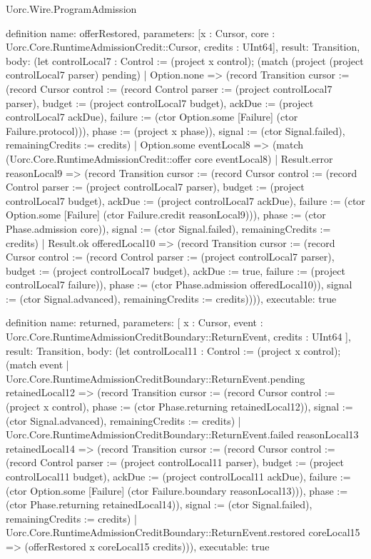 \begin{lexlean}{Uorc.Wire.ProgramAdmission}
\begin{semanticmodule}
definition{
  name: offerRestored,
  parameters: [x : Cursor, core : Uorc.Core.RuntimeAdmissionCredit::Cursor, credits : UInt64],
  result: Transition,
  body: (let controlLocal7 : Control := (project x control); (match (project (project controlLocal7 parser) pending)
    | Option.none => (record Transition {cursor := (record Cursor {control := (record Control {parser := (project controlLocal7 parser), budget := (project controlLocal7 budget), ackDue := (project controlLocal7 ackDue), failure := (ctor Option.some [Failure] (ctor Failure.protocol))}), phase := (project x phase)}), signal := (ctor Signal.failed), remainingCredits := credits})
    | Option.some eventLocal8 => (match (Uorc.Core.RuntimeAdmissionCredit::offer core eventLocal8)
      | Result.error reasonLocal9 => (record Transition {cursor := (record Cursor {control := (record Control {parser := (project controlLocal7 parser), budget := (project controlLocal7 budget), ackDue := (project controlLocal7 ackDue), failure := (ctor Option.some [Failure] (ctor Failure.credit reasonLocal9))}), phase := (ctor Phase.admission core)}), signal := (ctor Signal.failed), remainingCredits := credits})
      | Result.ok offeredLocal10 => (record Transition {cursor := (record Cursor {control := (record Control {parser := (project controlLocal7 parser), budget := (project controlLocal7 budget), ackDue := true, failure := (project controlLocal7 failure)}), phase := (ctor Phase.admission offeredLocal10)}), signal := (ctor Signal.advanced), remainingCredits := credits})))),
  executable: true
}

definition{
  name: returned,
  parameters: [
    x : Cursor,
    event : Uorc.Core.RuntimeAdmissionCreditBoundary::ReturnEvent,
    credits : UInt64
  ],
  result: Transition,
  body: (let controlLocal11 : Control := (project x control); (match event
    | Uorc.Core.RuntimeAdmissionCreditBoundary::ReturnEvent.pending retainedLocal12 => (record Transition {cursor := (record Cursor {control := (project x control), phase := (ctor Phase.returning retainedLocal12)}), signal := (ctor Signal.advanced), remainingCredits := credits})
    | Uorc.Core.RuntimeAdmissionCreditBoundary::ReturnEvent.failed reasonLocal13 retainedLocal14 => (record Transition {cursor := (record Cursor {control := (record Control {parser := (project controlLocal11 parser), budget := (project controlLocal11 budget), ackDue := (project controlLocal11 ackDue), failure := (ctor Option.some [Failure] (ctor Failure.boundary reasonLocal13))}), phase := (ctor Phase.returning retainedLocal14)}), signal := (ctor Signal.failed), remainingCredits := credits})
    | Uorc.Core.RuntimeAdmissionCreditBoundary::ReturnEvent.restored coreLocal15 => (offerRestored x coreLocal15 credits))),
  executable: true
}


\end{semanticmodule}
\end{lexlean}
